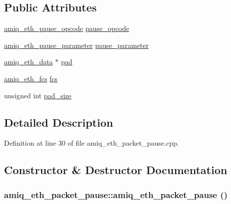 \subsection*{Public Attributes}
\begin{DoxyCompactItemize}
\item 
\hyperlink{amiq__eth__types_8cpp_a882c4ca2cfd45ca7e4ab471fbaf6f348}{amiq\_\-eth\_\-pause\_\-opcode} \hyperlink{classamiq__eth__packet__pause_a31d48860ec5bc33e5e3c76a88a5cbd94}{pause\_\-opcode}
\item 
\hyperlink{amiq__eth__types_8cpp_a9506f5917bf0b1e03bd6946e62cc4a55}{amiq\_\-eth\_\-pause\_\-parameter} \hyperlink{classamiq__eth__packet__pause_ab767bf1d61f35e59a74babfe730ffe20}{pause\_\-parameter}
\item 
\hyperlink{amiq__eth__types_8cpp_a3595a0a508d433d383d3e5521fc0b723}{amiq\_\-eth\_\-data} $\ast$ \hyperlink{classamiq__eth__packet__pause_a23b5341742ff52a6144b1088cfe86ff8}{pad}
\item 
\hyperlink{amiq__eth__types_8cpp_adb511dc715b55539c6abdad1de981a9f}{amiq\_\-eth\_\-fcs} \hyperlink{classamiq__eth__packet__pause_a2ea030b909dafbd1470053eb13960eaa}{fcs}
\item 
unsigned int \hyperlink{classamiq__eth__packet__pause_ab2323424453362f82d9fc86ee9667e46}{pad\_\-size}
\end{DoxyCompactItemize}


\subsection{Detailed Description}


Definition at line 30 of file amiq\_\-eth\_\-packet\_\-pause.cpp.

\subsection{Constructor \& Destructor Documentation}
\hypertarget{classamiq__eth__packet__pause_ade911eec6984347c30f8b537b585c095}{
\subsubsection[{amiq\_\-eth\_\-packet\_\-pause}]{\setlength{\rightskip}{0pt plus 5cm}amiq\_\-eth\_\-packet\_\-pause::amiq\_\-eth\_\-packet\_\-pause ()}}
\label{classamiq__eth__packet__pause_ade911eec6984347c30f8b537b585c095}


